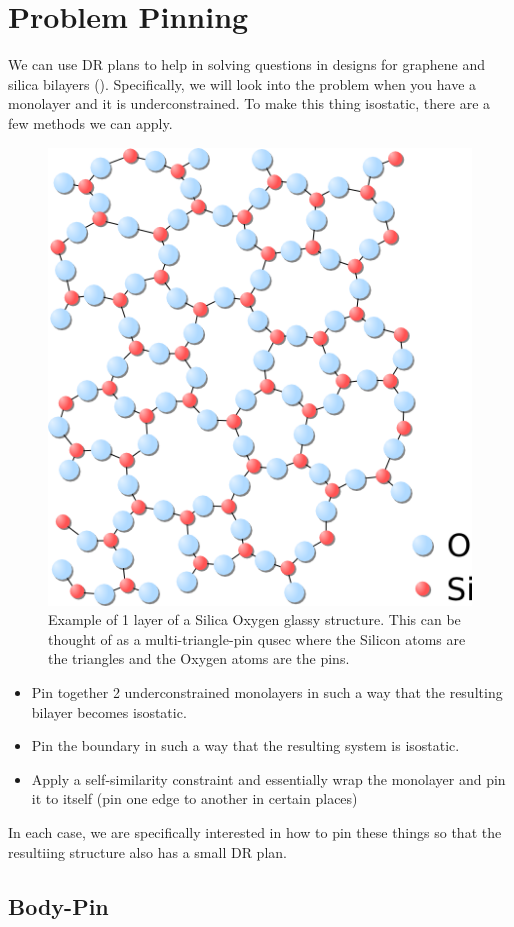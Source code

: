 \section{Problem Pinning}

We can use DR plans to help in solving questions in designs for graphene and silica bilayers (). Specifically, we will look into the problem when you have a monolayer and it is underconstrained. To make this thing isostatic, there are a few methods we can apply.

\begin{figure}\centering
    \includegraphics[width=0.5\linewidth]{img/Silica}
    \caption{Example of 1 layer of a Silica Oxygen glassy structure. This can be thought of as a multi-triangle-pin qusec where the Silicon atoms are the triangles and the Oxygen atoms are the pins.}
\end{figure}


\begin{itemize}
    \item Pin together 2 underconstrained monolayers in such a way that the resulting bilayer becomes isostatic.
    \item Pin the boundary in such a way that the resulting system is isostatic.
    \item Apply a self-similarity constraint and essentially wrap the monolayer and pin it to itself (pin one edge to another in certain places)
\end{itemize}

In each case, we are specifically interested in how to pin these things so that the resultiing structure also has a small DR plan.

\subsection{Body-Pin}

